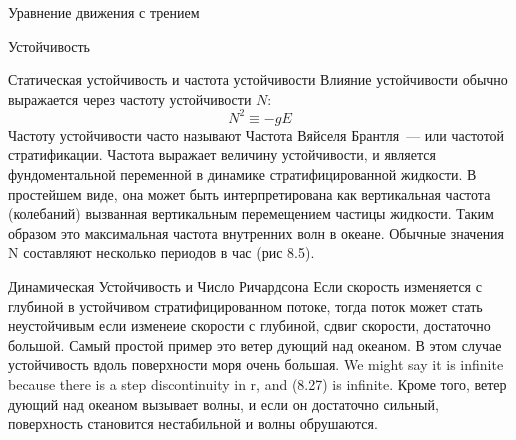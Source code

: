 \begin{chapter}{Уравнение движения с трением}
\begin{section}{Устойчивость}
\begin{paragraph}{Статическая устойчивость и частота устойчивости}
Влияние устойчивости обычно выражается через частоту устойчивости $N$:
\begin{equation}
N^2 \equiv -g E
\end{equation}
Частоту устойчивости часто называют Частота Вяйселя Брантля~--- или
частотой стратификации. Частота выражает величину устойчивости, и
является фундоментальной переменной в динамике стратифицированной
жидкости. В простейшем виде, она может быть интерпретирована как
вертикальная частота (колебаний) вызванная вертикальным перемещением
частицы жидкости. Таким образом это максимальная частота внутренних
волн в океане. Обычные значения N составляют несколько периодов в час
(рис 8.5).
%
\end{paragraph}

\begin{paragraph}{Динамическая Устойчивость и Число Ричардсона}
Если скорость изменяется с глубиной в устойчивом стратифицированном
потоке, тогда поток может стать неустойчивым если изменеие скорости с
глубиной, сдвиг скорости, достаточно большой. Самый простой пример это
ветер дующий над океаном. В этом случае устойчивость вдоль поверхности
моря очень большая. We might say it is infinite because there is a
step discontinuity in r, and (8.27) is infinite. Кроме того, ветер
дующий над океаном вызывает волны, и если он достаточно сильный,
поверхность становится нестабильной и волны обрушаются.
%


\end{paragraph}
\end{section}
\end{chapter}
